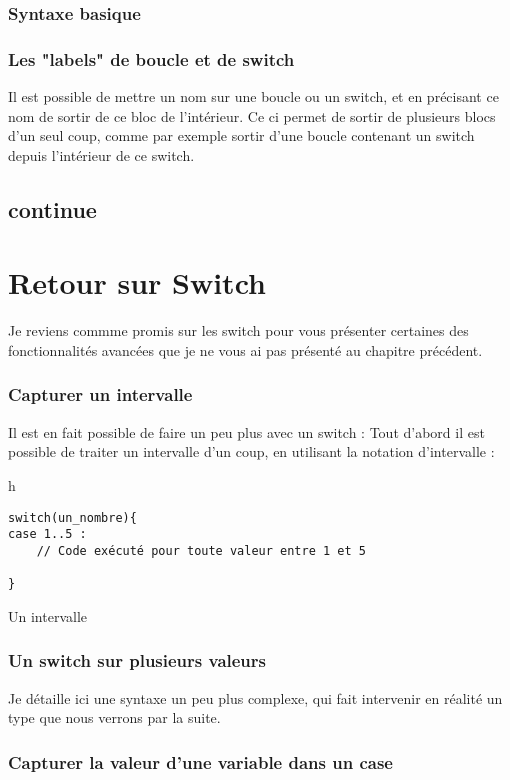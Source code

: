 \subsubsection{Syntaxe basique}

\subsubsection{Les "labels" de boucle et de switch}
Il est possible de mettre un nom sur une boucle ou un switch, et en précisant ce nom de sortir de ce bloc de l'intérieur. Ce ci permet de sortir de plusieurs blocs d'un seul coup, comme par exemple sortir d'une boucle contenant un switch depuis l'intérieur de ce switch.
\subsection{continue}

\section{Retour sur Switch}
Je reviens commme promis sur les switch pour vous présenter certaines des fonctionnalités avancées que je ne vous ai pas présenté au chapitre précédent.

\subsubsection{Capturer un intervalle} 
Il est en fait possible de faire un peu plus avec un switch :
Tout d'abord il est possible de traiter un intervalle d'un coup, en utilisant la notation d'intervalle :
\begin{listing}{h}
\begin{verbatim}
switch(un_nombre){
case 1..5 :
    // Code exécuté pour toute valeur entre 1 et 5

}
\end{verbatim}
\caption{Un intervalle}
\end{listing}
\subsubsection{Un switch sur plusieurs valeurs}
Je détaille ici une syntaxe un peu plus complexe, qui fait intervenir en réalité un type que nous verrons par la suite.

\subsubsection{Capturer la valeur d'une variable dans un case}

